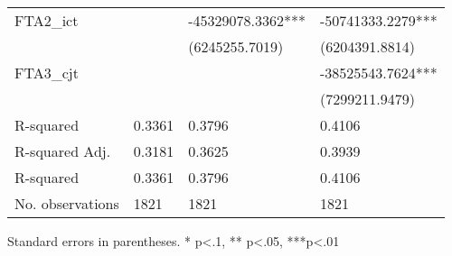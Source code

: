 \begin{table}
\begin{center}
\begin{tabular}{llll}
FTA2\_ict                &                   & -45329078.3362*** & -50741333.2279***   \\
                         &                   & (6245255.7019)    & (6204391.8814)      \\
FTA3\_cjt                &                   &                   & -38525543.7624***   \\
                         &                   &                   & (7299211.9479)      \\
R-squared                & 0.3361            & 0.3796            & 0.4106              \\
R-squared Adj.           & 0.3181            & 0.3625            & 0.3939              \\
R-squared                & 0.3361            & 0.3796            & 0.4106              \\
No. observations         & 1821              & 1821              & 1821                \\
\hline
\end{tabular}
\end{center}
\end{table}
\bigskip
Standard errors in parentheses. \newline 
* p<.1, ** p<.05, ***p<.01